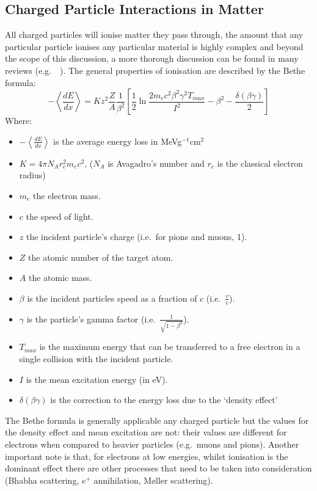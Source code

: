 \subsection{Charged Particle Interactions in Matter} %
\label{sec:charged_particle_interactions_in_matter}
All charged particles will ionise matter they pass through, the amount that any particular particle ionises any particular material is highly complex and beyond the scope of this discussion, a more thorough discussion can be found in many reviews (e.g.\ ~\cite{pdg}). The general properties of ionisation are described by the Bethe formula:
\begin{equation}\label{eq:bethe_formaula}
  -\left\langle\frac{dE}{dx}\right\rangle = Kz^2\frac{Z}{A} \frac{1}{\beta^2}\left[\frac{1}{2}\ln\frac{2m_{e}c^{2}\beta^2\gamma^2T_{max}}{I^2} -\beta^2 - \frac{\delta(\beta\gamma)}{2}\right]
\end{equation}
Where:
\begin{itemize}
  \item \( -\left\langle\frac{dE}{dx}\right\rangle \) is the average energy loss in MeVg\(^{-1}\)cm\(^2\)
  \item \( K = 4\pi N_A r^2_e m_e c^2\), (\( N_A \) is Avagadro's number and \( r_e \) is the classical electron radius) 
  \item \( m_e \) the electron mass.
  \item \( c \) the speed of light.
  \item \( z \) the incident particle's charge (i.e.\ for pions and muons, 1).
  \item \( Z \) the atomic number of the target atom.
  \item \( A \) the atomic mass.
  \item \( \beta \) is the incident particles speed as a fraction of \( c \) (i.e.\ \( \frac{v}{c} \)).
  \item \( \gamma \) is the particle's gamma factor (i.e.\ \( \frac{1}{\sqrt{1-\beta^2}} \)).
  \item \( T_{max} \) is the maximum energy that can be transferred to a free electron in a single collision with the incident particle.
  \item \( I \) is the mean excitation energy (in eV).
  \item \( \delta(\beta\gamma) \) is the correction to the energy loss due to the `density effect'
\end{itemize}
The Bethe formula is generally applicable any charged particle but the values for the density effect and mean excitation are not: their values are different for electrons when compared to heavier particles (e.g.\ muons and pions). Another important note is that, for electrons at low energies, whilst ionisation is the dominant effect there are other processes that need to be taken into consideration (Bhabha scattering, \(e^+\) annihilation, M\o ller scattering). 

